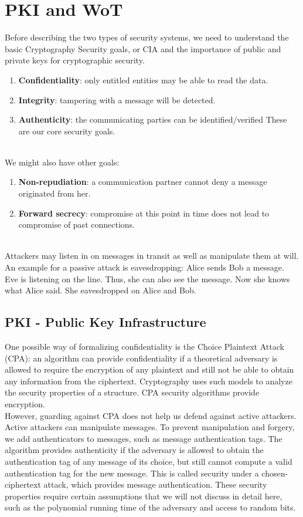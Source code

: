 \section{PKI and WoT}

Before describing the two types of security systems, we need to understand the basic 
Cryptography Security goals, or CIA and the importance of public and private keys 
for cryptographic security\cite{b31}.
\begin{enumerate}[]
    \item \textbf{Conﬁdentiality}: only entitled entities may be able to read the data.
    \item \textbf{Integrity}: tampering with a message will be detected.
    \item \textbf{Authenticity}: the communicating parties can be identiﬁed/veriﬁed These are our core security goals.
    \end{enumerate}
\\
We might also have other goals:
\begin{enumerate}[]
    \item \textbf{Non-repudiation}: a communication partner cannot deny a message originated from her.
    \item \textbf{Forward secrecy}: compromise at this point in time does not lead to compromise of past connections.
    \end{enumerate}
\\
Attackers may listen in on messages in transit as well as manipulate them at will. An example
for a passive attack is eavesdropping: Alice sends Bob a message. Eve is listening on the line.
Thus, she can also see the message. Now she knows what Alice said. She eavesdropped on
Alice and Bob.


\subsection{PKI - Public Key Infrastructure}
One possible way of formalizing confidentiality is the Choice Plaintext Attack (CPA): 
an algorithm can provide confidentiality if a theoretical adversary is allowed to require 
the encryption of any plaintext and still not be able to obtain any information from the 
ciphertext\cite{b38}. Cryptography uses such models to analyze the security properties of a structure. 
CPA security algorithms provide encryption\cite{b31}.
\\
However, guarding against CPA does not help us defend against active attackers. Active 
attackers can manipulate messages. To prevent manipulation and forgery, we add authenticators 
to messages, such as message authentication tags\cite{b38}. The algorithm provides authenticity if 
the adversary is allowed to obtain the authentication tag of any message of its choice, 
but still cannot compute a valid authentication tag for the new message. This is called 
security under a chosen-ciphertext attack, which provides message authentication.
These security properties require certain assumptions that we will not discuss in detail 
here, such as the polynomial running time of the adversary and access to random bits.

